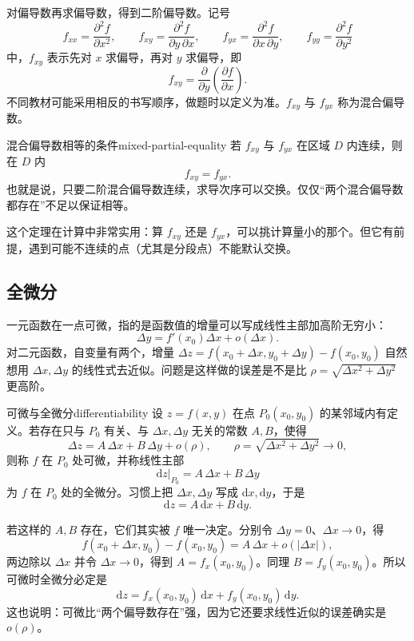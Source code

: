 对偏导数再求偏导数，得到二阶偏导数。记号
\[
    f_{xx}=\frac{\partial^2 f}{\partial x^2},\qquad
    f_{xy}=\frac{\partial^2 f}{\partial y\,\partial x},\qquad
    f_{yx}=\frac{\partial^2 f}{\partial x\,\partial y},\qquad
    f_{yy}=\frac{\partial^2 f}{\partial y^2}
\]
中，\(f_{xy}\) 表示先对 \(x\) 求偏导，再对 \(y\) 求偏导，即
\[
    f_{xy}=\frac{\partial}{\partial y}\left(\frac{\partial f}{\partial x}\right).
\]
不同教材可能采用相反的书写顺序，做题时以定义为准。\(f_{xy}\) 与 \(f_{yx}\) 称为混合偏导数。

\begin{conclusion}{混合偏导数相等的条件}{mixed-partial-equality}
    若 \(f_{xy}\) 与 \(f_{yx}\) 在区域 \(D\) 内连续，则在 \(D\) 内
    \[
        f_{xy}=f_{yx}.
    \]
    也就是说，只要二阶混合偏导数连续，求导次序可以交换。仅仅“两个混合偏导数都存在”不足以保证相等。
\end{conclusion}

这个定理在计算中非常实用：算 \(f_{xy}\) 还是 \(f_{yx}\)，可以挑计算量小的那个。但它有前提，遇到可能不连续的点（尤其是分段点）不能默认交换。

\subsection{全微分}

一元函数在一点可微，指的是函数值的增量可以写成线性主部加高阶无穷小：
\[
    \Delta y=f'(x_0)\Delta x+o(\Delta x).
\]
对二元函数，自变量有两个，增量 \(\Delta z=f(x_0+\Delta x,y_0+\Delta y)-f(x_0,y_0)\) 自然想用 \(\Delta x,\Delta y\) 的线性式去近似。问题是这样做的误差是不是比 \(\rho=\sqrt{\Delta x^2+\Delta y^2}\) 更高阶。

\begin{mydef}{可微与全微分}{differentiability}
    设 \(z=f(x,y)\) 在点 \(P_0(x_0,y_0)\) 的某邻域内有定义。若存在只与 \(P_0\) 有关、与 \(\Delta x,\Delta y\) 无关的常数 \(A,B\)，使得
    \[
        \Delta z
        =A\,\Delta x+B\,\Delta y+o(\rho),
        \qquad
        \rho=\sqrt{\Delta x^2+\Delta y^2}\to0,
    \]
    则称 \(f\) 在 \(P_0\) 处可微，并称线性主部
    \[
        \mathrm{d}z\big|_{P_0}=A\,\Delta x+B\,\Delta y
    \]
    为 \(f\) 在 \(P_0\) 处的全微分。习惯上把 \(\Delta x,\Delta y\) 写成 \(\mathrm{d}x,\mathrm{d}y\)，于是
    \[
        \mathrm{d}z=A\,\mathrm{d}x+B\,\mathrm{d}y.
    \]
\end{mydef}

若这样的 \(A,B\) 存在，它们其实被 \(f\) 唯一决定。分别令 \(\Delta y=0\)、\(\Delta x\to0\)，得
\[
    f(x_0+\Delta x,y_0)-f(x_0,y_0)
    =A\,\Delta x+o(\lvert\Delta x\rvert),
\]
两边除以 \(\Delta x\) 并令 \(\Delta x\to0\)，得到 \(A=f_x(x_0,y_0)\)。同理 \(B=f_y(x_0,y_0)\)。所以可微时全微分必定是
\[
    \mathrm{d}z=f_x(x_0,y_0)\,\mathrm{d}x+f_y(x_0,y_0)\,\mathrm{d}y.
\]
这也说明：可微比“两个偏导数存在”强，因为它还要求线性近似的误差确实是 \(o(\rho)\)。

